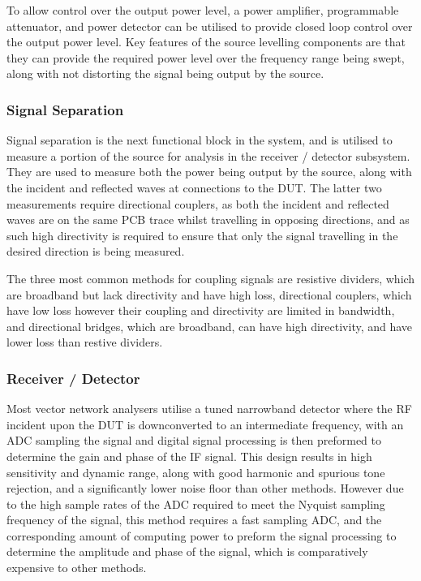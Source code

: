 To allow control over the output power level, a power amplifier, programmable attenuator, and power detector can be utilised to provide closed loop control over the output power level. Key features of the source levelling components are that they can provide the required power level over the frequency range being swept, along with not distorting the signal being output by the source. 

\subsubsection{Signal Separation}
\label{subsubsec:signal seperation}
Signal separation is the next functional block in the system, and is utilised to measure a portion of the source for analysis in the receiver / detector subsystem. They are used to measure both the power being output by the source, along with the incident and reflected waves at connections to the DUT. The latter two measurements require directional couplers, as both the incident and reflected waves are on the same PCB trace whilst travelling in opposing directions, and as such high directivity is required to ensure that only the signal travelling in the desired direction is being measured. 

The three most common methods for coupling signals are resistive dividers, which are broadband but lack directivity and have high loss, directional couplers, which have low loss however their coupling and directivity are limited in bandwidth, and directional bridges, which are broadband, can have high directivity, and have lower loss than restive dividers. 

\subsubsection{Receiver / Detector}
\label{subsubsec: receiver detector}
Most vector network analysers utilise a tuned narrowband detector where the RF incident upon the DUT is downconverted to an intermediate frequency, with an ADC sampling the signal and digital signal processing is then preformed to determine the gain and phase of the IF signal. This design results in high sensitivity and dynamic range, along with good harmonic and spurious tone rejection, and a significantly lower noise floor than other methods. However due to the high sample rates of the ADC required to meet the Nyquist sampling frequency of the signal, this method requires a fast sampling ADC, and the corresponding amount of computing power to preform the signal processing to determine the amplitude and phase of the signal, which is comparatively expensive to other methods.  

